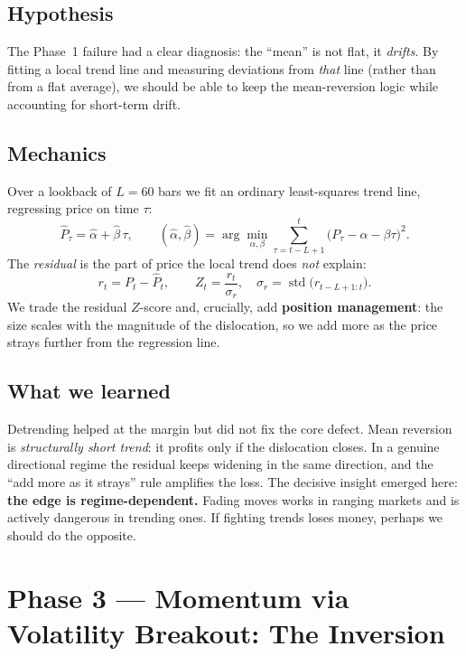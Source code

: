 \documentclass[11pt,a4paper]{article}
\begin{document}
\subsection{Hypothesis}
The Phase~1 failure had a clear diagnosis: the ``mean'' is not flat, it
\emph{drifts}. By fitting a local trend line and measuring deviations from
\emph{that} line (rather than from a flat average), we should be able to keep the
mean-reversion logic while accounting for short-term drift.

\subsection{Mechanics}
Over a lookback of $L=60$ bars we fit an ordinary least-squares trend line,
regressing price on time $\tau$:
\begin{equation}
  \hat{P}_\tau = \hat\alpha + \hat\beta\,\tau,
  \qquad
  (\hat\alpha,\hat\beta) = \arg\min_{\alpha,\beta}\sum_{\tau=t-L+1}^{t}\bigl(P_\tau-\alpha-\beta\tau\bigr)^2 .
\end{equation}
The \emph{residual} is the part of price the local trend does \emph{not} explain:
\begin{equation}
  r_t = P_t - \hat{P}_t,\qquad
  Z_t = \frac{r_t}{\sigma_r},\quad
  \sigma_r = \operatorname{std}\bigl(r_{t-L+1:t}\bigr).
\end{equation}
We trade the residual $Z$-score and, crucially, add \textbf{position management}:
the size scales with the magnitude of the dislocation, so we add more as the
price strays further from the regression line.

\subsection{What we learned}
Detrending helped at the margin but did not fix the core defect. Mean reversion is
\emph{structurally short trend}: it profits only if the dislocation closes. In a
genuine directional regime the residual keeps widening in the same direction, and
the ``add more as it strays'' rule amplifies the loss. The decisive insight emerged
here: \textbf{the edge is regime-dependent.} Fading moves works in ranging markets
and is actively dangerous in trending ones. If fighting trends loses money, perhaps
we should do the opposite.

\section{Phase 3 --- Momentum via Volatility Breakout: The Inversion}
\end{document}
